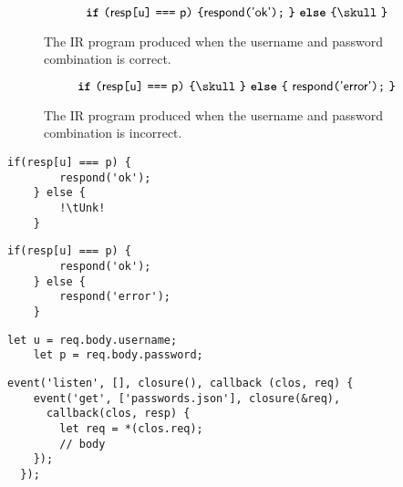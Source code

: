 \documentclass[sigplan,10pt,review=false,nonacm=true]{acmart}
\begin{document}
\begin{figure*}
\begin{subfigure}{\columnwidth}
\small
\[
    \tKw{if}~\tOp{(}\tId{resp}\tOp{[}\tId{u}\tOp{]}~\tOp{===}~\tId{p}\tOp{)}~\tOp{\{}  
    \tId{respond}\tOp{(}\tId{'ok'}\tOp{)}\tOp{;}~\tOp{\}}~\tKw{else}~\tOp{\{}
    \tUnk~\tOp{\}}
\]
\caption{The IR program produced when the username and password combination
is correct.}

\label{ir-correct-password}

\end{subfigure}

\begin{subfigure}{\columnwidth}
\small
\[
\tKw{if}~\tOp{(}\tId{resp}\tOp{[}\tId{u}\tOp{]}~\tOp{===}~\tId{p}\tOp{)}~
\tOp{\{}\tUnk~\tOp{\}}~\tKw{else}~
\tOp{\{}~\tId{respond}\tOp{(}\tId{'error'}\tOp{)}\tOp{;}~\tOp{\}}
\]
\caption{The IR program produced when the username and password combination
is incorrect.}

\label{ir-incorrect-password}

\end{subfigure}
\end{figure*}
    
\begin{figure*}
\lstset{language=JavaScript}
\begin{lstlisting}[escapechar=!]
    if(resp[u] === p) {
        respond('ok');
    } else {
        !\tUnk!
    }
\end{lstlisting}
\end{figure*}

\begin{figure*}
\lstset{language=JavaScript}
\begin{lstlisting}[escapechar=!]
    if(resp[u] === p) {
        respond('ok');
    } else {
        respond('error');
    }
\end{lstlisting}
\end{figure*}

\begin{figure*}
\lstset{language=JavaScript}
\begin{lstlisting}[escapechar=!]
    let u = req.body.username;
    let p = req.body.password;
\end{lstlisting}
\end{figure*}

\begin{figure*}
\lstset{language=JavaScript}
\begin{lstlisting}[escapechar=!]
  event('listen', [], closure(), callback (clos, req) {
    event('get', ['passwords.json'], closure(&req),
      callback(clos, resp) {
        let req = *(clos.req);
        // body
    });
  });
\end{lstlisting}
\end{figure*}
\end{document}
